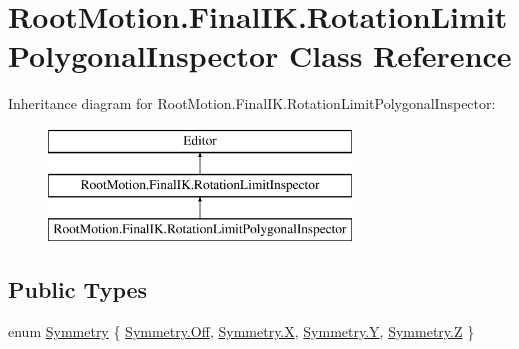 \hypertarget{class_root_motion_1_1_final_i_k_1_1_rotation_limit_polygonal_inspector}{}\section{Root\+Motion.\+Final\+I\+K.\+Rotation\+Limit\+Polygonal\+Inspector Class Reference}
\label{class_root_motion_1_1_final_i_k_1_1_rotation_limit_polygonal_inspector}
Inheritance diagram for Root\+Motion.\+Final\+I\+K.\+Rotation\+Limit\+Polygonal\+Inspector\+:\begin{figure}[H]
\begin{center}
\leavevmode
\includegraphics[height=3.000000cm]{class_root_motion_1_1_final_i_k_1_1_rotation_limit_polygonal_inspector}
\end{center}
\end{figure}
\subsection*{Public Types}
\begin{DoxyCompactItemize}
\item 
enum \mbox{\hyperlink{class_root_motion_1_1_final_i_k_1_1_rotation_limit_polygonal_inspector_a5f55b8c8d988e874fa81f18677d3d2d1}{Symmetry}} \{ \mbox{\hyperlink{class_root_motion_1_1_final_i_k_1_1_rotation_limit_polygonal_inspector_a5f55b8c8d988e874fa81f18677d3d2d1ad15305d7a4e34e02489c74a5ef542f36}{Symmetry.\+Off}}, 
\mbox{\hyperlink{class_root_motion_1_1_final_i_k_1_1_rotation_limit_polygonal_inspector_a5f55b8c8d988e874fa81f18677d3d2d1a02129bb861061d1a052c592e2dc6b383}{Symmetry.\+X}}, 
\mbox{\hyperlink{class_root_motion_1_1_final_i_k_1_1_rotation_limit_polygonal_inspector_a5f55b8c8d988e874fa81f18677d3d2d1a57cec4137b614c87cb4e24a3d003a3e0}{Symmetry.\+Y}}, 
\mbox{\hyperlink{class_root_motion_1_1_final_i_k_1_1_rotation_limit_polygonal_inspector_a5f55b8c8d988e874fa81f18677d3d2d1a21c2e59531c8710156d34a3c30ac81d5}{Symmetry.\+Z}}
 \}
\end{DoxyCompactItemize}
